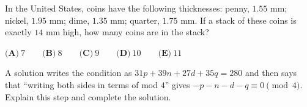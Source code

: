 In the United States, coins have the following thicknesses: penny, $1.55$ mm; nickel, $1.95$ mm; dime, $1.35$ mm; quarter, $1.75$ mm. If a stack of these coins is exactly $14$ mm high, how many coins are in the stack?

$\textbf{(A)}\ 7\qquad\textbf{(B)}\ 8\qquad\textbf{(C)}\ 9\qquad\textbf{(D)}\ 10\qquad\textbf{(E)}\ 11$

A solution writes the condition as $31p+39n+27d+35q=280$ and then says that ``writing both sides in terms of mod $4$'' gives $-p-n-d-q\equiv0\pmod4$. Explain this step and complete the solution.
